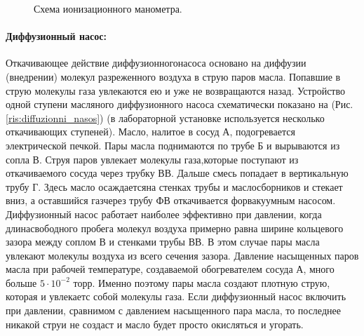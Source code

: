 \documentclass{article}
\begin{document}
    \vspace{1cm}

    \begin{figure}[h]
        \caption{Схема ионизационного манометра.}
        \label{ris:ionizacionni_monometr}
    \end{figure}

    \newpage

    \paragraph{Диффузионный насос:}
    Откачивающее действие диффузионногонасоса основано на диффузии (внедрении) молекул разреженного воздуха в струю паров масла. Попавшие в струю молекулы газа увлекаются ею и уже не возвращаются назад. Устройство одной ступени масляного диффузионного насоса схематически показано на (Рис. \ref{ris:diffuzionni_nasos}) (в лабораторной установке используется несколько откачивающих ступеней). Масло, налитое в сосуд А, подогревается электрической печкой. Пары масла поднимаются по трубе Б и вырываются из сопла В. Струя паров увлекает молекулы газа,которые поступают из откачиваемого сосуда через трубку ВВ. Дальше смесь попадает в вертикальную трубу Г. Здесь масло осаждаетсяна стенках трубы и маслосборников и стекает вниз, а оставшийся газчерез трубу ФВ откачивается форвакуумным насосом. Диффузионный насос работает наиболее эффективно при давлении, когда длинасвободного пробега молекул воздуха примерно равна ширине кольцевого зазора между соплом В и стенками трубы ВВ. В этом случае пары масла увлекают молекулы воздуха из всего сечения зазора. Давление насыщенных паров масла при рабочей температуре, создаваемой обогревателем сосуда А, много больше $5\cdot10^{-2}$ торр. Именно поэтому пары масла создают плотную струю, которая и увлекаетс собой молекулы газа. Если диффузионный насос включить при давлении, сравнимом с давлением насыщенного пара масла, то последнее никакой струи не создаст и масло будет просто окисляться и угорать.
\end{document}
